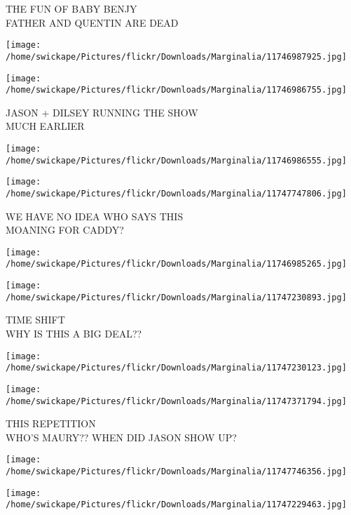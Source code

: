 \documentclass[10pt,letterpaper]{article}
\begin{document}
THE FUN OF BABY BENJY\\
FATHER AND QUENTIN ARE DEAD\\
\pagebreak

\texttt{[image: /home/swickape/Pictures/flickr/Downloads/Marginalia/11746987925.jpg]}

\vspace{0.25in}
\texttt{[image: /home/swickape/Pictures/flickr/Downloads/Marginalia/11746986755.jpg]}

JASON + DILSEY RUNNING THE SHOW\\
MUCH EARLIER\\
\pagebreak

\texttt{[image: /home/swickape/Pictures/flickr/Downloads/Marginalia/11746986555.jpg]}

\vspace{0.25in}
\texttt{[image: /home/swickape/Pictures/flickr/Downloads/Marginalia/11747747806.jpg]}

WE HAVE NO IDEA WHO SAYS THIS\\
MOANING FOR CADDY?\\
\pagebreak

\texttt{[image: /home/swickape/Pictures/flickr/Downloads/Marginalia/11746985265.jpg]}

\vspace{0.25in}
\texttt{[image: /home/swickape/Pictures/flickr/Downloads/Marginalia/11747230893.jpg]}

TIME SHIFT\\
WHY IS THIS A BIG DEAL??\\
\pagebreak

\texttt{[image: /home/swickape/Pictures/flickr/Downloads/Marginalia/11747230123.jpg]}

\vspace{0.25in}
\texttt{[image: /home/swickape/Pictures/flickr/Downloads/Marginalia/11747371794.jpg]}

THIS REPETITION\\
WHO'S MAURY?? WHEN DID JASON SHOW UP?\\
\pagebreak

\texttt{[image: /home/swickape/Pictures/flickr/Downloads/Marginalia/11747746356.jpg]}

\vspace{0.25in}
\texttt{[image: /home/swickape/Pictures/flickr/Downloads/Marginalia/11747229463.jpg]}
\end{document}
